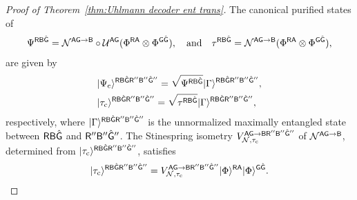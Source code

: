 \begin{proof}[Proof of Theorem~\ref{thm:Uhlmann decoder ent trans}]
The canonical purified states of
\begin{align}
\label{inteq:11}
    \Psi^{\sR\sB\hat{\sG}} = \cN^{\sA\sG\rarr\sB}\circ\cU^{\sA\sG}(\Phi^{\sR\sA}\otimes\Phi^{\sG\hat{\sG}}), \ \ \ \text{and} \ \ \ \tau^{\sR\sB\hat{\sG}} = \cN^{\sA\sG\rarr\sB}(\Phi^{\sR\sA}\otimes\Phi^{\sG\hat{\sG}}),
\end{align}
are given by 
\begin{align}
    &\ket{\Psi_{\rm c}}^{\sR\sB\hat{\sG}\sR''\sB''\hat{\sG}''} = \sqrt{\Psi^{\sR\sB\hat{\sG}}}\ket{\Gamma}^{\sR\sB\hat{\sG}\sR''\sB''\hat{\sG}''}, \label{Eq:PsiCanonical} \\
    &\ket{\tau_{\rm c}}^{\sR\sB\hat{\sG}\sR''\sB''\hat{\sG}''} = \sqrt{\tau^{\sR\sB\hat{\sG}}}\ket{\Gamma}^{\sR\sB\hat{\sG}\sR''\sB''\hat{\sG}''},
\end{align}
respectively, where $\ket{\Gamma}^{\sR\sB\hat{\sG}\sR''\sB''\hat{\sG}''}$ is the unnormalized maximally entangled state between $\sR\sB\hat{\sG}$ and $\sR''\sB''\hat{\sG}''$.
The Stinespring isometry $V_{\cN, \tau_{\rm c}}^{\sA\sG\rarr\sB\sR''\sB''\hat{\sG}''}$ of $\cN^{\sA\sG\rarr\sB}$, determined from $\ket{\tau_{\rm c}}^{\sR\sB\hat{\sG}\sR''\sB''\hat{\sG}''}$, satisfies
\begin{align}
\label{inteq:66}
    \ket{\tau_{\rm c}}^{\sR\sB\hat{\sG}\sR''\sB''\hat{\sG}''} 
    = V_{\cN, \tau_{\rm c}}^{\sA\sG\rarr\sB\sR''\sB''\hat{\sG}''}\ket{\Phi}^{\sR\sA}\ket{\Phi}^{\sG\hat{\sG}}.
\end{align}




\end{proof}
